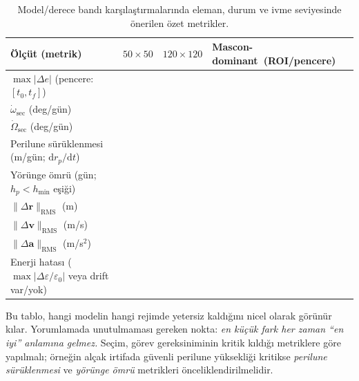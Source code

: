 \begin{table}[h]
\centering
\small
\renewcommand{\arraystretch}{1.15}
\begin{tabular}{|p{5.0cm}|p{3.3cm}|p{3.3cm}|p{3.3cm}|}
\hline
\textbf{Ölçüt (metrik)} &
\textbf{$50\times50$} &
\textbf{$120\times120$} &
\textbf{Mascon-dominant\footnotesize\ (ROI/pencere)} \\ \hline

$\max|\Delta e|$ \newline (pencere: $[t_0,t_f]$) &  &  &  \\ \hline
$\dot{\omega}_{\text{sec}}$ \newline (deg/gün) &  &  &  \\ \hline
$\dot{\Omega}_{\text{sec}}$ \newline (deg/gün) &  &  &  \\ \hline
Perilune sürüklenmesi \newline (m/gün; $\mathrm{d}r_p/\mathrm{d}t$) &  &  &  \\ \hline
Yörünge ömrü \newline (gün; $h_p<h_{\min}$ eşiği) &  &  &  \\ \hline
$\|\Delta \mathbf r\|_{\text{RMS}}$ \newline (m) &  &  &  \\ \hline
$\|\Delta \mathbf v\|_{\text{RMS}}$ \newline (m/s) &  &  &  \\ \hline
$\|\Delta \mathbf a\|_{\text{RMS}}$ \newline (m/s$^{2}$) &  &  &  \\ \hline
Enerji hatası \newline ($\max|\Delta\varepsilon/\varepsilon_0|$ veya drift var/yok) &  &  &  \\ \hline

\end{tabular}
\caption{Model/derece bandı karşılaştırmalarında eleman, durum ve ivme seviyesinde önerilen özet metrikler.}
\label{tab:report_metrics_template}
\end{table}

\noindent
Bu tablo, hangi modelin hangi rejimde yetersiz kaldığını nicel olarak görünür kılar. Yorumlamada unutulmaması gereken nokta:
\emph{en küçük fark her zaman ``en iyi'' anlamına gelmez.} Seçim, görev gereksiniminin kritik kıldığı metriklere göre yapılmalı;
örneğin alçak irtifada güvenli perilune yüksekliği kritikse \emph{perilune sürüklenmesi} ve \emph{yörünge ömrü} metrikleri
önceliklendirilmelidir.





